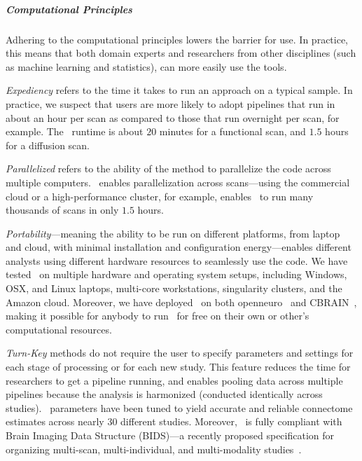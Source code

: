 \documentclass[11pt]{article}
\begin{document}
\begin{multicols}{2}
\subparagraph*{Computational Principles}
Adhering to the computational principles lowers the barrier for use. In practice, this means that both domain experts and researchers from other disciplines (such as machine learning and statistics), can more easily use the tools.  

\emph{Expediency} refers to the time it takes to run an approach on a typical sample.  
In practice, we suspect that users are more likely to adopt pipelines that run in about an hour per scan as compared to those that run overnight per scan, for example.
The \ndmg~runtime is about $20$ minutes for a functional scan, and $1.5$ hours for a diffusion scan. 

\emph{Parallelized} refers to the ability of the method to parallelize the code across multiple computers.  \ndmg~enables parallelization across scans---using the commercial cloud or a high-performance cluster, for example, enables \ndmg~to run many thousands of scans in only $1.5$ hours.

\emph{Portability}---meaning the ability to be run on different platforms, from laptop and cloud, with minimal installation and configuration energy---enables different analysts using different hardware resources to seamlessly use the code. We have tested \ndmg~on multiple hardware and operating system setups, including Windows, OSX, and Linux laptops,  multi-core workstations, singularity clusters, and the Amazon cloud.  Moreover, we have deployed \ndmg~on both openneuro~\cite{openneuro} and CBRAIN~\cite{CBRAIN}, making it possible for anybody to  run \ndmg~for free on their own or other's computational resources.  

\emph{Turn-Key} methods do not require the user to specify parameters and settings for each stage of processing or for each new study. This feature reduces the time for researchers to get a pipeline running, and enables pooling data across multiple pipelines because the analysis is harmonized (conducted identically across studies). 
\ndmg~parameters have been tuned to yield accurate and reliable connectome estimates across nearly 30 different studies.  
Moreover, \ndmg~is fully compliant with Brain Imaging Data Structure (BIDS)---a recently proposed specification for organizing multi-scan, multi-individual, and multi-modality studies~\cite{bids, bidsapps}.  


\end{multicols}
\end{document}
